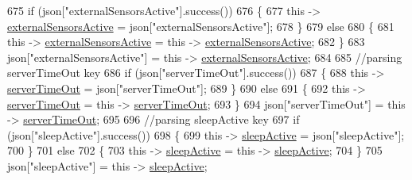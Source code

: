 \begin{DoxyCode}
675             \textcolor{keywordflow}{if} (json[\textcolor{stringliteral}{"externalSensorsActive"}].success())
676             \{
677                 \textcolor{keyword}{this} -> \hyperlink{classCoolBoard_a638b00b76aeb819ecfd4c10b8cdd7bb7}{externalSensorsActive} = json[\textcolor{stringliteral}{"externalSensorsActive"}];
678             \}
679             \textcolor{keywordflow}{else}
680             \{
681                 \textcolor{keyword}{this} -> \hyperlink{classCoolBoard_a638b00b76aeb819ecfd4c10b8cdd7bb7}{externalSensorsActive} = \textcolor{keyword}{this} -> 
      \hyperlink{classCoolBoard_a638b00b76aeb819ecfd4c10b8cdd7bb7}{externalSensorsActive};
682             \}
683             json[\textcolor{stringliteral}{"externalSensorsActive"}] = \textcolor{keyword}{this} -> \hyperlink{classCoolBoard_a638b00b76aeb819ecfd4c10b8cdd7bb7}{externalSensorsActive};
684 
685             \textcolor{comment}{//parsing serverTimeOut key}
686             \textcolor{keywordflow}{if} (json[\textcolor{stringliteral}{"serverTimeOut"}].success())
687             \{
688                 \textcolor{keyword}{this} -> \hyperlink{classCoolBoard_a7a8d8d3d316220cdd049cd63c1aa8fe6}{serverTimeOut} = json[\textcolor{stringliteral}{"serverTimeOut"}];
689             \}
690             \textcolor{keywordflow}{else}
691             \{
692                 \textcolor{keyword}{this} -> \hyperlink{classCoolBoard_a7a8d8d3d316220cdd049cd63c1aa8fe6}{serverTimeOut} = \textcolor{keyword}{this} -> \hyperlink{classCoolBoard_a7a8d8d3d316220cdd049cd63c1aa8fe6}{serverTimeOut};
693             \}
694             json[\textcolor{stringliteral}{"serverTimeOut"}] = \textcolor{keyword}{this} -> \hyperlink{classCoolBoard_a7a8d8d3d316220cdd049cd63c1aa8fe6}{serverTimeOut};
695             
696             \textcolor{comment}{//parsing sleepActive key}
697             \textcolor{keywordflow}{if} (json[\textcolor{stringliteral}{"sleepActive"}].success())
698             \{
699                 \textcolor{keyword}{this} -> \hyperlink{classCoolBoard_a0a51b2287139f66c738101fb53139230}{sleepActive} = json[\textcolor{stringliteral}{"sleepActive"}];
700             \}
701             \textcolor{keywordflow}{else}
702             \{
703                 \textcolor{keyword}{this} -> \hyperlink{classCoolBoard_a0a51b2287139f66c738101fb53139230}{sleepActive} = \textcolor{keyword}{this} -> \hyperlink{classCoolBoard_a0a51b2287139f66c738101fb53139230}{sleepActive};
704             \}
705             json[\textcolor{stringliteral}{"sleepActive"}] = \textcolor{keyword}{this} -> \hyperlink{classCoolBoard_a0a51b2287139f66c738101fb53139230}{sleepActive};

\end{DoxyCode}
